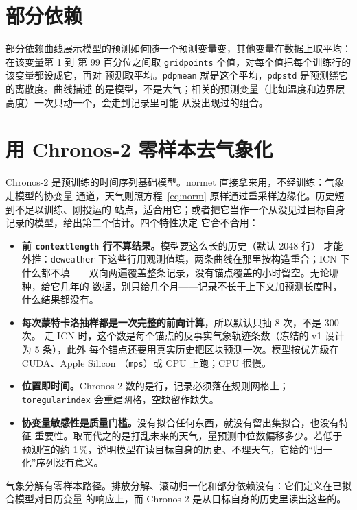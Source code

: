 \documentclass[11pt]{ctexrep}
\newcommand{\nosep}{\setlength{\itemsep}{0pt}\setlength{\parskip}{0pt}\setlength{\topsep}{2pt}}
\newcommand{\nm}{\textsf{normet}}
\newcommand{\codeunderscore}{\textunderscore\allowbreak}
\newcommand{\code}[1]{\texttt{\let\_\codeunderscore #1}}
\begin{document}
\section{部分依赖}\label{sec:pdptheory}
部分依赖曲线展示模型的预测如何随一个预测变量变，其他变量在数据上取平均：在该变量第 1 到
第 99 百分位之间取 \code{grid\_points} 个值，对每个值把每个训练行的该变量都设成它，再对
预测取平均。\code{pdp\_mean} 就是这个平均，\code{pdp\_std} 是预测绕它的离散度。曲线描述
的是模型，不是大气；相关的预测变量（比如温度和边界层高度）一次只动一个，会走到记录里可能
从没出现过的组合。

\section{用 Chronos-2 零样本去气象化}\label{sec:chronos}
Chronos-2 是预训练的时间序列基础模型。\nm{} 直接拿来用，不经训练：气象走模型的协变量
通道，天气则照方程~\eqref{eq:norm} 原样通过重采样边缘化。历史短到不足以训练、刚投运的
站点，适合用它；或者把它当作一个从没见过目标自身记录的模型，给出第二个估计。四个特性决定
它合不合用：
\begin{itemize}\nosep
  \item \textbf{前 \code{context\_length} 行不算结果。}模型要这么长的历史（默认 2048 行）
        才能外推：\code{deweather} 下这些行用观测值填，两条曲线在那里按构造重合；ICN 下
        什么都不填——双向两遍覆盖整条记录，没有锚点覆盖的小时留空。无论哪种，给它几年的
        数据，别只给几个月——记录不长于上下文加预测长度时，什么结果都没有。
  \item \textbf{每次蒙特卡洛抽样都是一次完整的前向计算}，所以默认只抽 8 次，不是 300 次。
        走 ICN 时，这个数是每个锚点的反事实气象轨迹条数（冻结的 v1 设计为 5 条），此外
        每个锚点还要用真实历史把区块预测一次。模型按优先级在 CUDA、Apple Silicon
        （\code{mps}）或 CPU 上跑；CPU 很慢。
  \item \textbf{位置即时间。}Chronos-2 数的是行，记录必须落在规则网格上；
        \code{to\_regular\_index} 会重建网格，空缺留作缺失。
  \item \textbf{协变量敏感性是质量门槛。}没有拟合任何东西，就没有留出集拟合，也没有特征
        重要性。取而代之的是打乱未来的天气，量预测中位数偏移多少。若低于预测值的约
        1\,\%，说明模型在读目标自身的历史、不理天气，它给的“归一化”序列没有意义。
\end{itemize}
气象分解有零样本路径。排放分解、滚动归一化和部分依赖没有：它们定义在已拟合模型对日历变量
的响应上，而 Chronos-2 是从目标自身的历史里读出这些的。
\end{document}
